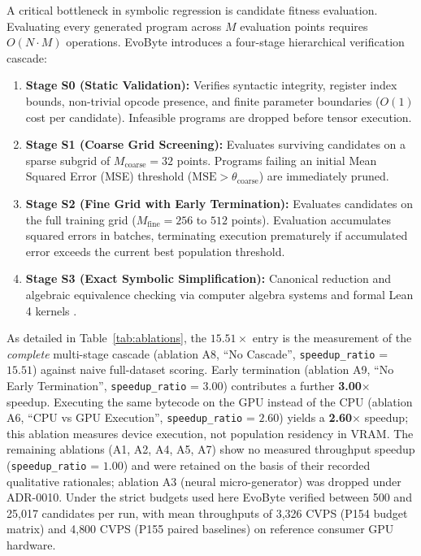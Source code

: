 \documentclass[11pt,a4paper]{article}
\begin{document}
A critical bottleneck in symbolic regression is candidate fitness evaluation. Evaluating every generated program across $M$ evaluation points requires $O(N \cdot M)$ operations. EvoByte introduces a four-stage hierarchical verification cascade:
\begin{enumerate}
    \item \textbf{Stage S0 (Static Validation):} Verifies syntactic integrity, register index bounds, non-trivial opcode presence, and finite parameter boundaries ($O(1)$ cost per candidate). Infeasible programs are dropped before tensor execution.
    \item \textbf{Stage S1 (Coarse Grid Screening):} Evaluates surviving candidates on a sparse subgrid of $M_{\text{coarse}} = 32$ points. Programs failing an initial Mean Squared Error (MSE) threshold ($\text{MSE} > \theta_{\text{coarse}}$) are immediately pruned.
    \item \textbf{Stage S2 (Fine Grid with Early Termination):} Evaluates candidates on the full training grid ($M_{\text{fine}} = 256$ to $512$ points). Evaluation accumulates squared errors in batches, terminating execution prematurely if accumulated error exceeds the current best population threshold.
    \item \textbf{Stage S3 (Exact Symbolic Simplification):} Canonical reduction and algebraic equivalence checking via computer algebra systems and formal Lean 4 kernels \cite{demoura2021lean4}.
\end{enumerate}



As detailed in Table~\ref{tab:ablations}, the $15.51\times$ entry is the measurement of the
\emph{complete} multi-stage cascade (ablation A8, ``No Cascade'', \texttt{speedup\_ratio} =
$15.51$) against naive full-dataset scoring. Early termination (ablation A9, ``No Early
Termination'', \texttt{speedup\_ratio} = $3.00$) contributes a further \textbf{3.00$\times$}
speedup. Executing the same bytecode on the GPU instead of the CPU (ablation A6, ``CPU vs
GPU Execution'', \texttt{speedup\_ratio} = $2.60$) yields a \textbf{2.60$\times$} speedup;
this ablation measures device execution, not population residency in VRAM. The remaining
ablations (A1, A2, A4, A5, A7) show no measured throughput speedup
(\texttt{speedup\_ratio} = $1.00$) and were retained on the basis of their recorded
qualitative rationales; ablation A3 (neural micro-generator) was dropped under ADR-0010.
Under the strict budgets used here EvoByte verified between 500 and 25{,}017 candidates per
run, with mean throughputs of 3{,}326 CVPS (P154 budget matrix) and 4{,}800 CVPS (P155 paired
baselines) on reference consumer GPU hardware.
\end{document}
